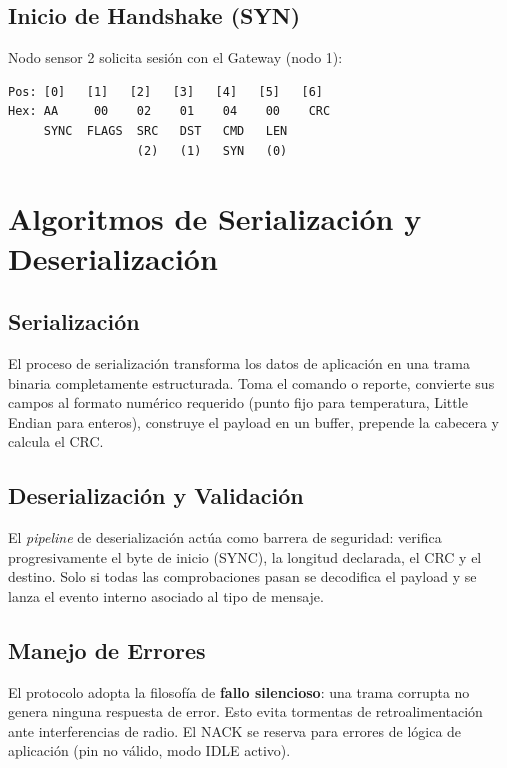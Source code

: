 \subsection{Inicio de Handshake (SYN)}
Nodo sensor 2 solicita sesión con el Gateway (nodo 1):

\begin{lstlisting}[style=trama, caption={Trama SYN mínima --- 7 bytes}]
Pos: [0]   [1]   [2]   [3]   [4]   [5]   [6]
Hex: AA     00    02    01    04    00    CRC
     SYNC  FLAGS  SRC   DST   CMD   LEN
                  (2)   (1)   SYN   (0)
\end{lstlisting}

\section{Algoritmos de Serialización y Deserialización}

\subsection{Serialización}

El proceso de serialización transforma los datos de aplicación en una trama binaria
completamente estructurada. Toma el comando o reporte, convierte sus campos al
formato numérico requerido (punto fijo para temperatura, Little Endian para enteros),
construye el payload en un buffer, prepende la cabecera y calcula el CRC.

\subsection{Deserialización y Validación}

El \textit{pipeline} de deserialización actúa como barrera de seguridad: verifica
progresivamente el byte de inicio (SYNC), la longitud declarada, el CRC y el destino.
Solo si todas las comprobaciones pasan se decodifica el payload y se lanza el evento
interno asociado al tipo de mensaje.

\subsection{Manejo de Errores}

\begin{warningbox}
El protocolo adopta la filosofía de \textbf{fallo silencioso}: una trama corrupta no genera
ninguna respuesta de error. Esto evita tormentas de retroalimentación ante interferencias de
radio. El NACK se reserva para errores de lógica de aplicación (pin no válido, modo IDLE activo).
\end{warningbox}

